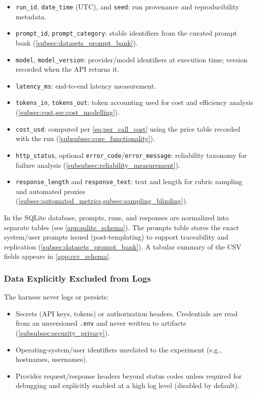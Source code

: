 \begin{itemize}
\item \texttt{run\_id}, \texttt{date\_time} (UTC), and \texttt{seed}: run provenance and reproducibility metadata.
\item \texttt{prompt\_id}, \texttt{prompt\_category}: stable identifiers from the curated prompt bank (\cref{subsec:datasets_prompt_bank}).
\item \texttt{model}, \texttt{model\_version}: provider/model identifiers at execution time; version recorded when the API returns it.
\item \texttt{latency\_ms}: end-to-end latency measurement.
\item \texttt{tokens\_in}, \texttt{tokens\_out}: token accounting used for cost and efficiency analysis (\cref{subsec:cost,sec:cost_modelling}).
\item \texttt{cost\_usd}: computed per \cref{eq:per_call_cost} using the price table recorded with the run (\cref{subsubsec:core_functionality}).
\item \texttt{http\_status}, optional \texttt{error\_code}/\texttt{error\_message}: reliability taxonomy for failure analysis (\cref{subsubsec:reliability_measurement}).
\item \texttt{response\_length} and \texttt{response\_text}: text and length for rubric sampling and automated proxies (\cref{subsec:automated_metrics,subsec:sampling_blinding}).
\end{itemize}

In the SQLite database, prompts, runs, and responses are normalized into separate tables (see \cref{app:sqlite_schema}). The prompts table stores the exact system/user prompts issued (post-templating) to support traceability and replication (\cref{subsec:datasets_prompt_bank}). A tabular summary of the CSV fields appears in \cref{app:csv_schema}.

\subsubsection{Data Explicitly Excluded from Logs}\label{subsubsec:data_excluded}

The harness never logs or persists:

\begin{itemize}
\item Secrets (API keys, tokens) or authorization headers. Credentials are read from an unversioned \verb|.env| and never written to artifacts (\cref{subsubsec:security_privacy}).
\item Operating-system/user identifiers unrelated to the experiment (e.g., hostnames, usernames).
\item Provider request/response headers beyond status codes unless required for debugging and explicitly enabled at a high log level (disabled by default).
\end{itemize}

